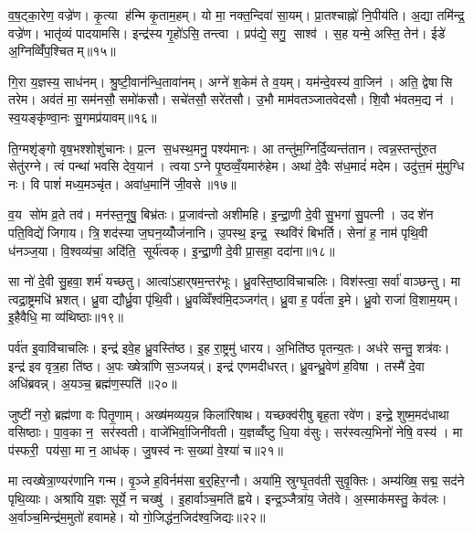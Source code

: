 व॒ष॒ट्का॒रेण॒ वज्रे॑ण। कृ॒त्या ह॑न्मि कृ॒ताम॒हम्। यो मा॒ नक्त॒न्दिवा॑ सा॒यम्। प्रा॒तश्चाह्नो॑ नि॒पीय॑ति। अ॒द्या तमि॑न्द्र॒ वज्रे॑ण। भातृ॑व्यं पादयामसि। इन्द्र॑स्य गृ॒हो॑ऽसि॒ तन्त्वा। प्रप॑द्ये॒ सगु॒ साश्व॑। स॒ह यन्मे॒ अस्ति॒ तेन॑। ईडे॑ अ॒ग्निव्विँ॑प॒श्चितम्॥१५॥

गि॒रा य॒ज्ञस्य॒ साध॑नम्। श्रु॒ष्टी॒वान॑न्धि॒तावा॑नम्। अग्ने॑ श॒केम॑ ते व॒यम्। यम॑न्दे॒वस्य॑ वा॒जिन॑। अति॒ द्वेषासि तरेम। अव॑तं मा॒ सम॑नसौ॒ समो॑कसौ। सचे॑तसौ॒ सरे॑तसौ। उ॒भौ माम॑वतञ्जातवेदसौ। शि॒वौ भ॑वतम॒द्य न॑। स्व॒यङ्कृ॑ण्वा॒नः सु॒गमप्र॑यावम्॥१६॥

ति॒ग्मशृ॑ङ्गो वृष॒भश्शोशु॑चानः। प्र॒त्न स॒धस्थ॒मनु॒ पश्य॑मानः। आ तन्तु॑म॒ग्निर्दि॒व्यन्त॑तान। त्वन्न॒स्तन्तु॑रु॒त सेतु॑रग्ने। त्वं पन्था॑ भवसि देव॒यान॑। त्वयाऽग्ने पृ॒ष्ठव्वँ॒यमारु॑हेम। अथा॑ दे॒वैः स॑ध॒मादं॑ मदेम। उदु॑त्त॒मं मु॑मुग्धि नः। वि पाशं॑ मध्य॒मञ्चृ॑त। अवा॑ध॒मानि॑ जी॒वसे॥१७॥

व॒य सो॑म व्र॒ते तव॑। मन॑स्त॒नूषु॒ बिभ्र॑तः। प्र॒जाव॑न्तो अशीमहि। इ॒न्द्रा॒णी दे॒वी सु॒भगा॑ सु॒पत्नी। उदशे॑न पति॒विद्ये॑ जिगाय। त्रि॒शद॑स्या ज॒घन॒य्योँज॑नानि। उ॒पस्थ॒ इन्द्र॒ स्थवि॑रं बिभर्ति। सेना॑ ह॒ नाम॑ पृथि॒वी ध॑नञ्ज॒या। वि॒श्वव्य॑चा॒ अदि॑ति॒ सूर्य॑त्वक्। इ॒न्द्रा॒णी दे॒वी प्रा॒सहा॒ ददा॑ना॥१८॥

सा नो॑ दे॒वी सु॒हवा॒ शर्म॑ यच्छतु। आत्वा॑ऽहार्‌षम॒न्तर॑भूः। ध्रु॒वस्ति॒ष्ठावि॑चाचलिः। विश॑स्त्वा॒ सर्वा॑ वाञ्छन्तु। मा त्वद्रा॒ष्ट्रमधि॑ भ्रशत्। ध्रु॒वा द्यौर्ध्रु॒वा पृ॑थि॒वी। ध्रु॒वव्विँश्व॑मि॒दञ्जग॑त्। ध्रु॒वा ह॒ पर्व॑ता इ॒मे। ध्रु॒वो राजा॑ वि॒शाम॒यम्। इ॒हैवैधि॒ मा व्य॑थिष्ठाः॥१९॥

पर्व॑त इ॒वावि॑चाचलिः। इन्द्र॑ इवे॒ह ध्रु॒वस्ति॑ष्ठ। इ॒ह रा॒ष्ट्रमु॑ धारय। अ॒भिति॑ष्ठ पृतन्य॒तः। अध॑रे सन्तु॒ शत्र॑वः। इन्द्र॑ इव वृत्र॒हा ति॑ष्ठ। अ॒पः ख्षेत्रा॑णि स॒ञ्जयन्न्॑। इन्द्र॑ एणमदीधरत्। ध्रु॒वन्ध्रु॒वेण॑ ह॒विषा। तस्मै॑ दे॒वा अधि॑ब्रवन्न्। अ॒यञ्च॒ ब्रह्म॑ण॒स्पति॑॥२०॥\anuvakamend[ह॒विर्भि॑रा॒स्य॑मभि॒ दास॑तो विप॒श्चित॒मप्र॑यावञ्जी॒वसे॒ ददा॑ना व्यथिष्ठा ब्रव॒न्नेक॑ञ्च]

जुष्टी॑ नरो॒ ब्रह्म॑णा वः पितृ॒णाम्। अख्ष॑मव्यय॒न्न किला॑रिषाथ। यच्छक्व॑रीषु बृह॒ता रवे॑ण। इन्द्रे॒ शुष्म॒मद॑धाथा वसिष्ठाः। पा॒व॒का न॒ सर॑स्वती। वाजे॑भिर्वा॒जिनी॑वती। य॒ज्ञव्वँ॑ष्टु धि॒या व॑सुः। सर॑स्वत्य॒भिनो॑ नेषि॒ वस्य॑। मा प॑स्फरी॒ पय॑सा॒ मा न॒ आध॑क्। जु॒षस्व॑ नः स॒ख्या॑ वे॒श्या॑ च॥२१॥

मा त्वख्षेत्रा॒ण्यर॑णानि गन्म। वृ॒ञ्जे ह॒विर्नम॑सा ब॒र्॒हिर॒ग्नौ। अया॑मि॒ स्रुग्घृ॒तव॑ती सुवृ॒क्तिः। अम्य॑ख्षि॒ सद्म॒ सद॑ने पृथि॒व्याः। अश्रा॑यि य॒ज्ञः सूर्ये॒ न चख्षु॑। इ॒हार्वाञ्च॒मति॑ ह्वये। इन्द्र॒ञ्जैत्रा॑य॒ जेत॑वे। अ॒स्माक॑मस्तु॒ केव॑लः। अ॒र्वाञ्च॒मिन्द्र॑म॒मुतो॑ हवामहे। यो गो॒जिद्ध॑न॒जिद॑श्व॒जिद्यः॥२२॥

